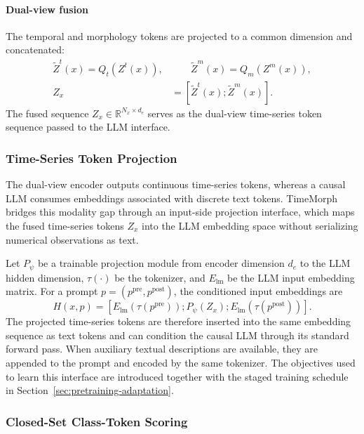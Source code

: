 \documentclass[10pt,journal,compsoc]{IEEEtran}
\begin{document}
\paragraph{Dual-view fusion}
The temporal and morphology tokens are projected to a common dimension and concatenated:
\begin{equation}
\label{eq:dual-view-fusion}
\begin{aligned}
\tilde{Z}^{t}(x)=Q_t(Z^{t}(x)),
&\qquad
\tilde{Z}^{m}(x)=Q_m(Z^{m}(x)),
\\
Z_x&=
\left[
\tilde{Z}^{t}(x);
\tilde{Z}^{m}(x)
\right].
\end{aligned}
\end{equation}
The fused sequence $Z_x\in\mathbb{R}^{N_x\times d_e}$ serves as the dual-view time-series token sequence passed to the LLM interface.

\subsubsection{Time-Series Token Projection}
\label{sec:token-projection}
The dual-view encoder outputs continuous time-series tokens, whereas a causal LLM consumes embeddings associated with discrete text tokens.
TimeMorph bridges this modality gap through an input-side projection interface, which maps the fused time-series tokens $Z_x$ into the LLM embedding space without serializing numerical observations as text.

Let $P_\psi$ be a trainable projection module from encoder dimension $d_e$ to the LLM hidden dimension, $\tau(\cdot)$ be the tokenizer, and $E_{\mathrm{lm}}$ be the LLM input embedding matrix.
For a prompt $p=(p^{\mathrm{pre}},p^{\mathrm{post}})$, the conditioned input embeddings are
\begin{equation}
\label{eq:conditioned-input}
H(x,p)=
\left[
E_{\mathrm{lm}}(\tau(p^{\mathrm{pre}}));
P_{\psi}(Z_x);
E_{\mathrm{lm}}(\tau(p^{\mathrm{post}}))
\right].
\end{equation}
The projected time-series tokens are therefore inserted into the same embedding sequence as text tokens and can condition the causal LLM through its standard forward pass.
When auxiliary textual descriptions are available, they are appended to the prompt and encoded by the same tokenizer.
The objectives used to learn this interface are introduced together with the staged training schedule in Section~\ref{sec:pretraining-adaptation}.

\subsubsection{Closed-Set Class-Token Scoring}
\label{sec:class-token-classification}
\end{document}
